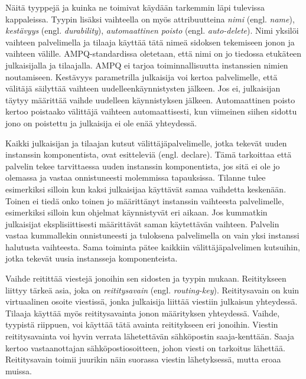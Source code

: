 Näitä tyyppejä ja kuinka ne toimivat käydään tarkemmin läpi tulevissa kappaleissa. Tyypin lisäksi vaihteella on myös attribuutteina \emph{nimi} (engl. \emph{name}), \emph{kestävyys} (engl. \emph{durability}), \emph{automaattinen poisto} (engl. \emph{auto-delete}). Nimi yksilöi vaihteen palvelimella ja tilaaja käyttää tätä nimeä sidoksen tekemiseen jonon ja vaihteen välille. AMPQ-standardissa oletetaan, että nimi on jo tiedossa etukäteen julkaisijalla ja tilaajalla. AMPQ ei tarjoa toiminnallisuutta instanssien nimien noutamiseen. Kestävyys parametrilla julkaisija voi kertoa palvelimelle, että välitäjä säilyttää vaihteen uudelleenkäynnistysten jälkeen. Jos ei, julkaisijan täytyy määrittää vaihde uudelleen käynnistyksen jälkeen. Automaattinen poisto kertoo poistaako välittäjä vaihteen automaattisesti, kun viimeinen siihen sidottu jono on poistettu ja julkaisija ei ole enää yhteydessä.

Kaikki julkaisijan ja tilaajan kutsut välittäjäpalvelimelle, jotka tekevät uuden instanssin komponentista, ovat esitteleviä (engl. declare). Tämä tarkoittaa että palvelin tekee tarvittaessa uuden instanssin komponentista, jos sitä ei ole jo olemassa ja vastaa onnistuneesti molemmissa tapauksissa. Tilanne tulee esimerkiksi silloin kun kaksi julkaisijaa käyttävät samaa vaihdetta keskenään. Toinen ei tiedä onko toinen jo määrittänyt instanssin vaihteesta palvelimelle, esimerkiksi silloin kun ohjelmat käynnistyvät eri aikaan. Jos kummatkin julkaisijat eksplisiittisesti määrittävät saman käytettävän vaihteen. Palvelin vastaa kummallekin onnistuneesti ja tuloksena palvelimella on vain yksi instanssi halutusta vaihteesta. Sama toiminta pätee kaikkiin välittäjäpalvelimen kutsuihin, jotka tekevät uusia instansseja komponenteista.

Vaihde reitittää viestejä jonoihin sen sidosten ja tyypin mukaan. Reititykseen liittyy tärkeä asia, joka on \emph{reititysavain} (engl. \emph{routing-key}). Reititysavain on kuin virtuaalinen osoite viestissä, jonka julkaisija liittää viestiin julkaisun yhteydessä. Tilaaja käyttää myös reititysavainta jonon määrityksen yhteydessä. Vaihde, tyypistä riippuen, voi käyttää tätä avainta reititykseen eri jonoihin. Viestin reititysavainta voi hyvin verrata lähetettävän sähköpostin saaja-kenttään. Saaja kertoo vastaanottajan sähköpostiosoitteen, johon viesti on tarkoitus lähettää. Reititysavain toimii juurikin näin suorassa viestin lähetyksessä, mutta eroaa muissa.


